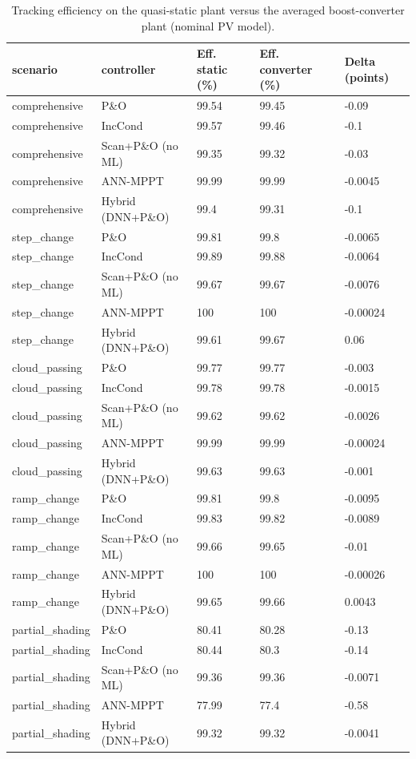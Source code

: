 \begin{table}[t]
\centering
\caption{Tracking efficiency on the quasi-static plant versus the averaged boost-converter plant (nominal PV model).}
\label{tab:Table_Converter_vs_Static}
\small
\begin{tabular}{lllll}
\hline
scenario & controller & Eff. static (\%) & Eff. converter (\%) & Delta (points) \\
\hline
comprehensive & P\&O & 99.54 & 99.45 & -0.09 \\
comprehensive & IncCond & 99.57 & 99.46 & -0.1 \\
comprehensive & Scan+P\&O (no ML) & 99.35 & 99.32 & -0.03 \\
comprehensive & ANN-MPPT & 99.99 & 99.99 & -0.0045 \\
comprehensive & Hybrid (DNN+P\&O) & 99.4 & 99.31 & -0.1 \\
step\_change & P\&O & 99.81 & 99.8 & -0.0065 \\
step\_change & IncCond & 99.89 & 99.88 & -0.0064 \\
step\_change & Scan+P\&O (no ML) & 99.67 & 99.67 & -0.0076 \\
step\_change & ANN-MPPT & 100 & 100 & -0.00024 \\
step\_change & Hybrid (DNN+P\&O) & 99.61 & 99.67 & 0.06 \\
cloud\_passing & P\&O & 99.77 & 99.77 & -0.003 \\
cloud\_passing & IncCond & 99.78 & 99.78 & -0.0015 \\
cloud\_passing & Scan+P\&O (no ML) & 99.62 & 99.62 & -0.0026 \\
cloud\_passing & ANN-MPPT & 99.99 & 99.99 & -0.00024 \\
cloud\_passing & Hybrid (DNN+P\&O) & 99.63 & 99.63 & -0.001 \\
ramp\_change & P\&O & 99.81 & 99.8 & -0.0095 \\
ramp\_change & IncCond & 99.83 & 99.82 & -0.0089 \\
ramp\_change & Scan+P\&O (no ML) & 99.66 & 99.65 & -0.01 \\
ramp\_change & ANN-MPPT & 100 & 100 & -0.00026 \\
ramp\_change & Hybrid (DNN+P\&O) & 99.65 & 99.66 & 0.0043 \\
partial\_shading & P\&O & 80.41 & 80.28 & -0.13 \\
partial\_shading & IncCond & 80.44 & 80.3 & -0.14 \\
partial\_shading & Scan+P\&O (no ML) & 99.36 & 99.36 & -0.0071 \\
partial\_shading & ANN-MPPT & 77.99 & 77.4 & -0.58 \\
partial\_shading & Hybrid (DNN+P\&O) & 99.32 & 99.32 & -0.0041 \\
\hline
\end{tabular}
\end{table}
